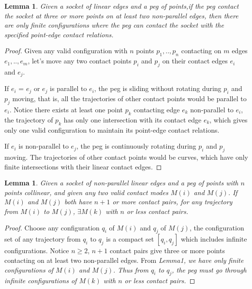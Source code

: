 \documentclass[letterpaper, 10 pt, conference]{ieeeconf}
\newtheorem{lemma}[theorem]{Lemma}
\begin{document}
\begin{lemma}
Given a socket of linear edges and a peg of points,if the peg contact the socket at three or more points on at least two non-parallel edges, then there are only finite configurations where the peg can contact the socket with the specified point-edge contact relations.
\end{lemma}

\begin{proof}
Given any valid configuration with $n$ points $p_1,..,p_n$ contacting on $m$ edges $e_1,..,e_m$, let’s move any two contact points $p_i$ and $p_j$ on their contact edges $e_i$ and $e_j$. 

If $e_i$ = $e_j$ or $e_j$ is parallel to $e_i$, the peg is sliding without rotating during $p_i$ and $p_j$ moving, that is, all the trajectories of other contact points would be parallel to $e_i$. Notice there exists at least one point $p_k$ contacting edge $e_k$ non-parallel to $e_i$, the trajectory of $p_k$ has only one intersection with its contact edge $e_k$, which gives only one valid configuration to maintain its point-edge contact relations.

If $e_i$ is non-parallel to $e_j$, the peg is continuously rotating during $p_i$ and $p_j$ moving. The trajectories of other contact points would be curves, which have only finite intersections with their linear contact edges. 
\end{proof}

\begin{lemma}
Given a socket of non-parallel linear edges and a peg of points with $n$ points collinear, and given any two valid contact modes $M(i)$ and $M(j)$. If $M(i)$ and $M(j)$ both have $n+1$ or more contact pairs, for any trajectory from $M(i)$ to $M(j)$, $\exists M(k)$ with $n$ or less contact pairs.
\end{lemma}

\begin{proof}
Choose any configuration $q_i$ of $M(i)$ and $q_j$ of $M(j)$, the configuration set of any trajectory from $q_i$ to $q_j$ is a compact set $[q_i,  q_j]$ which includes infinite configurations. Notice $n \geq 2$, $n+1$ contact pairs give three or more points contacting on at least two non-parallel edges. From \em{Lemma1}, we have only finite configurations of $M(i)$ and $M(j)$. Thus from $q_i$ to $q_j$, the peg must go through infinite configurations of $M(k)$ with $n$ or less contact pairs.
\end{proof}
\end{document}
